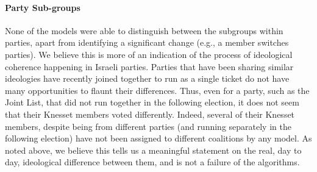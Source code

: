 \paragraph{Party Sub-groups}
None of the models were able to distinguish between the subgroups within
parties, apart from identifying a significant change (e.g., a member switches
parties).
We believe this is more of an indication of the process of ideological
coherence happening in Israeli parties.
Parties that have been sharing similar ideologies have recently joined together to run as a single ticket do not have many opportunities to flaunt their differences.
Thus, even for a party, such as the Joint List, that did not run together in
the following election, it does not seem that their Knesset members voted
differently.
Indeed, several of their Knesset members, despite being from different parties
(and running separately in the following election) have not been assigned to
different coalitions by any model.
As noted above, we believe this tells us a meaningful statement on the real,
day to day, ideological difference between them, and is not a failure of the
algorithms.

